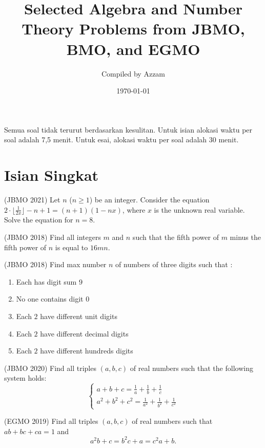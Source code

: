 \documentclass[11pt]{scrartcl}
\begin{document}
	\title{Selected Algebra and Number Theory Problems from JBMO, BMO, and EGMO} %
	\date{\today}
	\author{Compiled by Azzam}
	\maketitle
	Semua soal tidak terurut berdasarkan kesulitan. Untuk isian alokasi waktu per soal adalah 7,5 menit. Untuk esai, alokasi waktu per soal adalah 30 menit.
	\section{Isian Singkat}
	\begin{soalbaru}(JBMO 2021)
	Let $n$ ($n \ge 1$) be an integer. Consider the equation $2\cdot \lfloor{\frac{1}{2x}}\rfloor - n + 1 = (n + 1)(1 - nx)$, where $x$ is the unknown real variable. Solve the equation for $n = 8$.
	\end{soalbaru}
	
	\begin{soalbaru}(JBMO 2018)
	Find all integers $m$ and $n$ such that the fifth power of $m$ minus the fifth power of $n$ is equal to $16mn$.
	\end{soalbaru}
	
	\begin{soalbaru}(JBMO 2018)
	Find max number $n$ of numbers of three digits such that :
    \begin{enumerate}\item Each has digit sum $9$
\item No one contains digit $0$
\item Each $2$ have different unit digits
\item Each $2$ have different decimal digits
\item Each $2$ have different hundreds digits
    \end{enumerate}
	\end{soalbaru}

    \begin{soalbaru}(JBMO 2020)
    Find all triples $(a,b,c)$ of real numbers such that the following system holds:
$$\begin{cases} a+b+c=\frac{1}{a}+\frac{1}{b}+\frac{1}{c} \\a^2+b^2+c^2=\frac{1}{a^2}+\frac{1}{b^2}+\frac{1}{c^2}\end{cases}$$
    \end{soalbaru}
    
        \begin{soalbaru}(EGMO 2019)
    Find all triples $(a, b, c)$ of real numbers such that $ab + bc + ca = 1$ and $$a^2b + c = b^2c + a = c^2a + b.$$
    \end{soalbaru}
    
\end{document}
